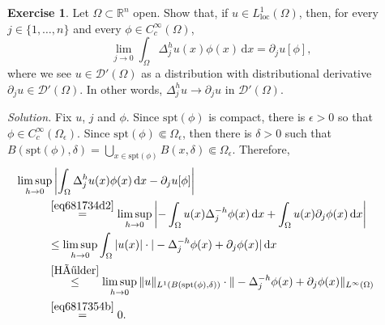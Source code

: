 \documentclass[a4paper,9pt]{amsart}
\newcommand{\scr}[1]{\mathscr{#1}}
\newcommand{\R}{\mathbb{R}}	%
\newcommand{\did}{\,\mathrm{d}}	%
\newcommand{\de}{\partial}		%
\newcommand{\spt}{\mathrm{spt}}
\newcommand{\loc}{\mathrm{loc}}
\theoremstyle{plain}
\theoremstyle{definition}
\newtheorem{exercise}[proposition]{Exercise}%
\theoremstyle{remark}
\begin{document}
\begin{exercise}
	Let $\Omega\subset\R^n$ open.
	Show that, if $u\in L^1_\loc(\Omega)$, then, for every $j\in\{1,\dots,n\}$ and every $\phi\in C^\infty_c(\Omega)$,
	\begin{equation}\label{eq6817480f}
		\lim_{j\to 0} \int_{\Omega} \Delta_j^h u(x) \phi(x) \did x 
		= \de_ju[\phi] ,
	\end{equation}
	where we see $u\in\scr D'(\Omega)$ as a distribution with distributional derivative $\de_ju\in\scr D'(\Omega)$.
	In other words, $\Delta_j^h u\to\de_ju$ in $\scr D'(\Omega)$.
	
	{\it Solution.}
	Fix $u$, $j$ and $\phi$.
	Since $\spt(\phi)$ is compact, there is $\epsilon>0$ so that $\phi\in C^\infty_c(\Omega_\epsilon)$.
	Since $\spt(\phi)\Subset\Omega_\epsilon$, then there is $\delta>0$ such that $B(\spt(\phi),\delta) = \bigcup_{x\in \spt(\phi)} B(x,\delta) \Subset\Omega_\epsilon$.
	Therefore, 
	\begin{equation}
	\begin{aligned}
		&\hspace{-1cm}
		\limsup_{h\to 0} \left| \int_{\Omega} \Delta_j^h u(x) \phi(x) \did x - \de_ju[\phi] \right| \\
		&\overset{\eqref{eq681734d2}}= \limsup_{h\to 0} \left| - \int_{\Omega}  u(x) \Delta_j^{-h}\phi(x) \did x + \int_{\Omega}  u(x) \de_j\phi(x) \did x \right| \\
		&\le \limsup_{h\to 0}  \int_{\Omega}  |u(x)|\cdot |-\Delta_j^{-h}\phi(x)+ \de_j\phi(x)| \did x  \\
		&\overset{\eqref{Hölder}}\le \limsup_{h\to 0} 
			\|u\|_{L^1(B(\spt(\phi),\delta))} \cdot
			\|-\Delta_j^{-h}\phi(x)+ \de_j\phi(x)\|_{L^{\infty}(\Omega)} \\
		&\overset{\eqref{eq6817354b}}=0 .
	\end{aligned}
	\end{equation}
\end{exercise}
\end{document}
